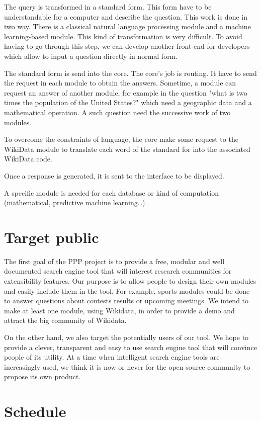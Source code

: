 \documentclass[a4paper,10pt]{article}
\begin{document}
The query is transformed in a standard form. This form have to be understandable for a computer and describe the question. This work is done in two way. There is a classical natural language processing module and a machine learning-based module. This kind of transformation is very difficult. To avoid having to go through this step, we can develop another front-end for developers which allow to input a question directly in normal form.

The standard form is send into the core. The core's job is routing. It have to send the request in each module to obtain the answers. Sometime, a module can request an answer of another module, for example in the question "what is two times the population of the United States?" which need a geographic data and a mathematical operation. A such question need the successive work of two modules.

To overcome the constraints of language, the core make some request to the WikiData module to translate each word of the standard for into the associated WikiData code.

Once a response is generated, it is sent to the interface to be displayed.

A specific module is needed for each database or kind of computation (mathematical, predictive machine learning\ldots).


\section{Target public}

The first goal of the PPP project is to provide a free, modular and well documented search engine tool that will 
interest research communities for extensibility features. Our purpose is to allow people to design their own modules and
easily include them in the tool. For example, sports modules could be done to answer questions about contests results or 
upcoming meetings. We intend to make at least one module, using Wikidata, in order to provide a demo and attract the big 
community of Wikidata. 

On the other hand, we also target the potentially users of our tool. We hope to provide a clever, transparent and easy to use search 
engine tool that will convince people of its utility. At a time when intelligent search engine tools are increasingly used, we think it is
now or never for the open source community to propose its own product.

\section{Schedule}
\end{document}
